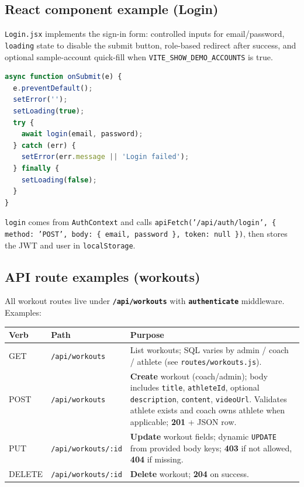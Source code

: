 \documentclass[11pt,letterpaper]{article}
\begin{document}
\subsection{React component example (Login)}
\texttt{Login.jsx} implements the sign-in form: controlled inputs for email/password, \texttt{loading} state to disable the submit button, role-based redirect after success, and optional sample-account quick-fill when \texttt{VITE\_SHOW\_DEMO\_ACCOUNTS} is true.

\begin{lstlisting}[language=JavaScript,caption={Excerpt from \texttt{frontend/src/pages/Login.jsx} (submit handler)}]
async function onSubmit(e) {
  e.preventDefault();
  setError('');
  setLoading(true);
  try {
    await login(email, password);
  } catch (err) {
    setError(err.message || 'Login failed');
  } finally {
    setLoading(false);
  }
}
\end{lstlisting}

\texttt{login} comes from \texttt{AuthContext} and calls \texttt{apiFetch('/api/auth/login', \{ method: 'POST', body: \{ email, password \}, token: null \})}, then stores the JWT and user in \texttt{localStorage}.

\subsection{API route examples (workouts)}
All workout routes live under \textbf{\texttt{/api/workouts}} with \textbf{\texttt{authenticate}} middleware. Examples:

\begin{longtable}{@{}llp{3.5in}@{}}
  \toprule
  \textbf{Verb} & \textbf{Path} & \textbf{Purpose} \\
  \midrule
  \endhead
  GET & \texttt{/api/workouts} & List workouts; SQL varies by admin / coach / athlete (see \texttt{routes/workouts.js}). \\
  POST & \texttt{/api/workouts} & \textbf{Create} workout (coach/admin); body includes \texttt{title}, \texttt{athleteId}, optional \texttt{description}, \texttt{content}, \texttt{videoUrl}. Validates athlete exists and coach owns athlete when applicable; \textbf{201} + JSON row. \\
  PUT & \texttt{/api/workouts/:id} & \textbf{Update} workout fields; dynamic \texttt{UPDATE} from provided body keys; \textbf{403} if not allowed, \textbf{404} if missing. \\
  DELETE & \texttt{/api/workouts/:id} & \textbf{Delete} workout; \textbf{204} on success. \\
  \bottomrule
\end{longtable}
\end{document}
